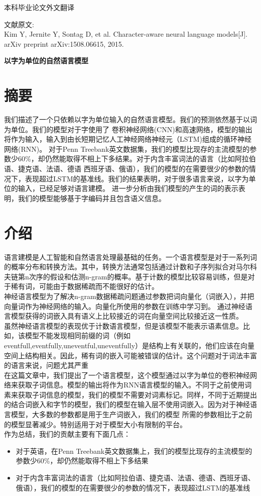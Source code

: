 {\sanhao\heiti\filcenter \centerline{本科毕业论文外文翻译}}
文献原文:\\
Kim Y, Jernite Y, Sontag D, et al. Character-aware neural language models[J]. arXiv preprint arXiv:1508.06615, 2015.\\
{\sihao\songti\filcenter \centerline{\textbf{以字为单位的自然语言模型}}}

\section*{摘要}
  我们描述了一个只依赖以字为单位输入的自然语言模型。我们的预测依然基于以词为单位。我们的模型对于字使用了
  卷积神经网络(CNN)和高速网络，模型的输出将作为输入，输入到由长短期记忆人工神经网络神经元（LSTM)组成的循环神经网络(RNN)。
  对于Penn Treebank英文数据集，我们的模型比现存的主流模型的参数少60\%，却仍然能取得不相上下多结果。对于内含丰富词法的语言（比如阿拉伯语、捷克语、法语、德语
  西班牙语、俄语），我们的模型的在需要很少的参数的情况下，表现超过LSTM的基准线。我们的结果表明，对于很多语言来说，以字为单位的输入，已经足够对语言建模。
  进一步分析由我们模型的产生的词的表示表明，我们的模型能够基于字编码并且包含语义信息。

\section{介绍}
语言建模是人工智能和自然语言处理最基础的任务。一个语言模型是对于一系列词的概率分布和转换方法。其中，转换方法通常包括通过计数和子序列拟合对马尔科夫链第n次序的假设和估测n-gram的概率。基于计数的模型比较容易训练，但是对于稀有词，可能由于数据稀疏而不能很好的估计。
\\
神经语言模型为了解决n-gram数据稀疏问题通过参数把词向量化（词嵌入），并把向量词作为神经网络的输入。向量化所使用的参数在训练中学习到。
通过神经语言模型获得的词嵌入具有语义上比较接近的词在向量空间比较接近这一性质。\\
虽然神经语言模型的表现优于计数语言模型，但是该模型不能表示语素信息。比如，该模型不能发现相同前缀的词（例如eventfull,eventfully,uneventful,uneventfully）是结构上有关联的，他们应该在向量空间上结构相关。因此，稀有词的嵌入可能被错误的估计。这个问题对于词法丰富的语言来说，问题尤其严重\\
在这篇文章中，我们提出了一个语言模型，这个模型通过以字为单位的卷积神经网络来获取子词信息。模型的输出将作为RNN语言模型的输入。不同于之前使用词素来获取子词信息的模型，我们的模型不需要对词素标记。同样，不同于近期提出的结合词嵌入和字节的模型，我们的模型在输入层不使用词嵌入。因为对于神经语言模型，大多数的参数都是用于生产词嵌入，我们的模型
所需的参数相比于之前的模型显著减少。特别适用于对于模型大小有限制的平台。\\
作为总结，我们的贡献主要有下面几点：\\
\begin{itemize}
\item 对于英语，在Penn Treebank英文数据集上，我们的模型比现存的主流模型的参数少60\%，却仍然能取得不相上下多结果
\item 对于内含丰富词法的语言（比如阿拉伯语、捷克语、法语、德语、西班牙语、俄语），我们的模型的在需要很少的参数的情况下，表现超过LSTM的基准线
\end{itemize}
